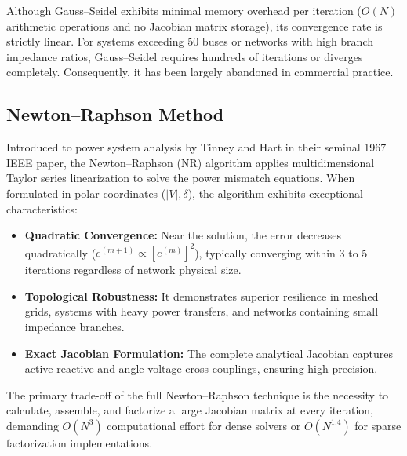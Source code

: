 \documentclass[12pt,a4paper,oneside]{report}
\begin{document}
Although Gauss--Seidel exhibits minimal memory overhead per iteration ($O(N)$ arithmetic operations and no Jacobian matrix storage), its convergence rate is strictly linear. For systems exceeding 50 buses or networks with high branch impedance ratios, Gauss--Seidel requires hundreds of iterations or diverges completely. Consequently, it has been largely abandoned in commercial practice.

\subsection{Newton--Raphson Method}
Introduced to power system analysis by Tinney and Hart in their seminal 1967 IEEE paper, the Newton--Raphson (NR) algorithm applies multidimensional Taylor series linearization to solve the power mismatch equations. When formulated in polar coordinates ($|V|, \delta$), the algorithm exhibits exceptional characteristics:
\begin{itemize}
    \item \textbf{Quadratic Convergence:} Near the solution, the error decreases quadratically ($e^{(m+1)} \propto [e^{(m)}]^2$), typically converging within 3 to 5 iterations regardless of network physical size.
    \item \textbf{Topological Robustness:} It demonstrates superior resilience in meshed grids, systems with heavy power transfers, and networks containing small impedance branches.
    \item \textbf{Exact Jacobian Formulation:} The complete analytical Jacobian captures active-reactive and angle-voltage cross-couplings, ensuring high precision.
\end{itemize}
The primary trade-off of the full Newton--Raphson technique is the necessity to calculate, assemble, and factorize a large Jacobian matrix at every iteration, demanding $O(N^3)$ computational effort for dense solvers or $O(N^{1.4})$ for sparse factorization implementations.
\end{document}
